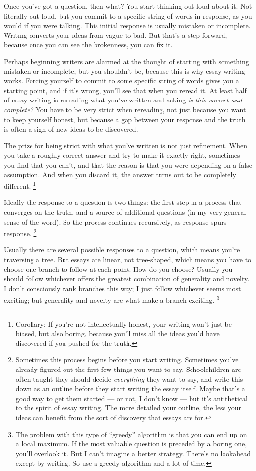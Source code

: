 \documentclass[12pt]{book}
\begin{document}
Once you've got a question, then what? You start thinking out loud about
it. Not literally out loud, but you commit to a specific string of words
in response, as you would if you were talking. This initial response is
usually mistaken or incomplete. Writing converts your ideas from vague
to bad. But that's a step forward, because once you can see the
brokenness, you can fix it.

Perhaps beginning writers are alarmed at the thought of starting with
something mistaken or incomplete, but you shouldn't be, because this is
why essay writing works. Forcing yourself to commit to some specific
string of words gives you a starting point, and if it's wrong, you'll
see that when you reread it. At least half of essay writing is rereading
what you've written and asking \emph{is this correct and complete?} You
have to be very strict when rereading, not just because you want to keep
yourself honest, but because a gap between your response and the truth
is often a sign of new ideas to be discovered.

The prize for being strict with what you've written is not just
refinement. When you take a roughly correct answer and try to make it
exactly right, sometimes you find that you can't, and that the reason is
that you were depending on a false assumption. And when you discard it,
the answer turns out to be completely different. \footnote{Corollary: If you're not intellectually honest, your writing
won't just be biased, but also boring, because you'll miss all the ideas
you'd have discovered if you pushed for the truth.}

Ideally the response to a question is two things: the first step in a
process that converges on the truth, and a source of additional
questions (in my very general sense of the word). So the process
continues recursively, as response spurs response.
\footnote{Sometimes this process begins before you start writing.
Sometimes you've already figured out the first few things you want to
say. Schoolchildren are often taught they should decide
\emph{everything} they want to say, and write this down as an outline
before they start writing the essay itself. Maybe that's a good way to
get them started --- or not, I don't know --- but it's antithetical to
the spirit of essay writing. The more detailed your outline, the less
your ideas can benefit from the sort of discovery that essays are for.}

Usually there are several possible responses to a question, which means
you're traversing a tree. But essays are linear, not tree-shaped, which
means you have to choose one branch to follow at each point. How do you
choose? Usually you should follow whichever offers the greatest
combination of generality and novelty. I don't consciously rank branches
this way; I just follow whichever seems most exciting; but generality
and novelty are what make a branch exciting. \footnote{The problem with this type of ``greedy'' algorithm is that you
can end up on a local maximum. If the most valuable question is preceded
by a boring one, you'll overlook it. But I can't imagine a better
strategy. There's no lookahead except by writing. So use a greedy
algorithm and a lot of time.}
\end{document}
